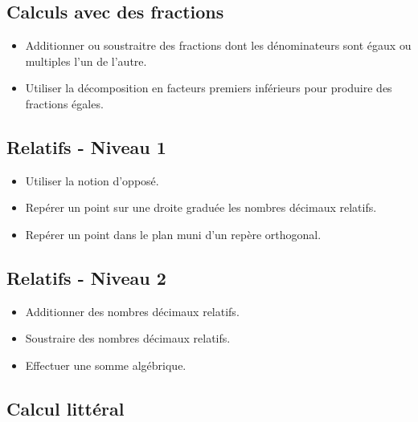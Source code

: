 \documentclass[a4paper,12pt,fleqn]{article}
\begin{document}
\subsection*{Calculs avec des fractions}

\begin{itemize}							
	\item {}	Additionner ou soustraitre des fractions dont les dénominateurs sont égaux ou multiples l’un de l’autre.																								
	\item {}	Utiliser la décomposition en facteurs premiers inférieurs pour produire des fractions égales.	
\end{itemize}

\subsection*{Relatifs - Niveau 1}

\begin{itemize}																								
	\item {}	Utiliser la notion d'opposé.																								
	\item {}	Repérer un point sur une droite graduée les nombres décimaux relatifs.																								
	\item {}	Repérer un point dans le plan muni d’un repère orthogonal.		
\end{itemize}

\subsection*{Relatifs - Niveau 2}

\begin{itemize}																																								
	\item {}	Additionner des nombres décimaux relatifs.																								
	\item {}	Soustraire des nombres décimaux relatifs.
	\item {} Effectuer une somme algébrique.
\end{itemize}

\subsection*{Calcul littéral}
\end{document}
